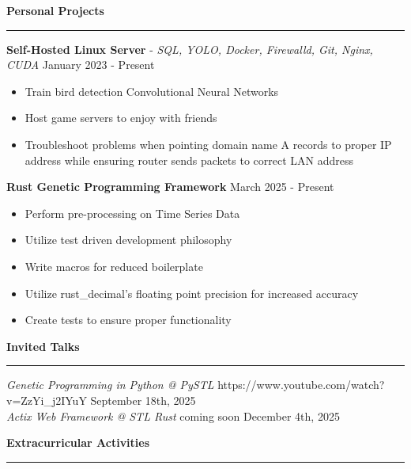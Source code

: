 \documentclass[11pt]{article}
\begin{document}

\vspace{1pt}  %
\textbf{Personal Projects}\par
\vspace{-12pt}
\noindent\rule{\textwidth}{0.4pt}

\textbf{Self-Hosted Linux Server} - \textsl{SQL, YOLO, Docker, Firewalld, Git, Nginx, CUDA} \hfill January 2023 - Present
\begin{itemize}[noitemsep, topsep=0pt, partopsep=0pt, parsep=0pt, itemsep=0pt]
    \small
    \item Train bird detection Convolutional Neural Networks
    \item Host game servers to enjoy with friends
    \item Troubleshoot problems when pointing domain name A records to proper IP address while ensuring router sends packets to correct LAN address
\end{itemize}

\textbf{Rust Genetic Programming Framework} \hfill March 2025 - Present
\begin{itemize}[noitemsep, topsep=0pt, partopsep=0pt, parsep=0pt, itemsep=0pt]
    \small
    \item Perform pre-processing on Time Series Data
    \item Utilize test driven development philosophy
    \item Write macros for reduced boilerplate
    \item Utilize rust\_decimal's floating point precision for increased accuracy
    \item Create tests to ensure proper functionality
\end{itemize}

\textbf{Invited Talks}\par
\vspace{-12pt}
\noindent\rule{\textwidth}{0.4pt}

\textsl{Genetic Programming in Python @ PySTL} \tiny{https://www.youtube.com/watch?v=ZzYi\_j2IYuY} \hfill \normalsize{September 18th, 2025}\\
\textsl{Actix Web Framework @ STL Rust} \tiny{coming soon} \hfill \normalsize{December 4th, 2025}

\textbf{Extracurricular Activities}\par
\vspace{-12pt}
\noindent\rule{\textwidth}{0.4pt}
\end{document}
